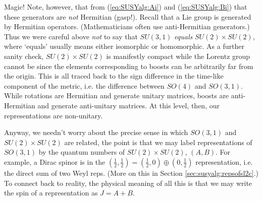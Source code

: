 \documentclass[12pt]{article}
\numberwithin{equation}{section}    %
\begin{document}
Magic! %
Note, however, that from  (\ref{eq:SUSYalg:Ai}) and (\ref{eq:SUSYalg:Bi}) that these generators are \emph{not} Hermitian (gasp!). 
Recall that a Lie group is generated by Hermitian operators. (Mathematicians often use anti-Hermitian generators.) Thus we were careful above \emph{not} to say that $SU(3,1)$ \textit{equals} $SU(2)\times SU(2)$, where `equals' usually means either isomorphic or homomorphic. As a further sanity check, $SU(2)\times SU(2)$ is manifestly compact while the Lorentz group cannot be since the elements corresponding to boosts can be arbitrarily far from the origin.
%
This is all traced back to the sign difference in the time-like component of the metric, i.e. the difference between $SO(4)$ and $SO(3,1)$. While rotations are Hermitian and generate unitary matrices, boosts are anti-Hermitian and generate anti-unitary matrices. At this level, then, our representations are non-unitary.

Anyway, we needn't worry about the precise sense in which $SO(3,1)$ and $SU(2)\times SU(2)$ are related, the point is that we may label representations of $SO(3,1)$ by the quantum numbers of $SU(2)\times SU(2)$, $(A,B)$. For example, a Dirac spinor is in the $(\frac 12, \frac 12)=(\frac 12, 0)\oplus (0,\frac 12)$ representation, i.e. the direct sum of two Weyl reps. (More on this in Section \ref{sec:susyalg:repsofsl2c}.) To connect back to reality, the physical meaning of all this is that we may write the spin of a representation as $J=A+B$.
\end{document}
